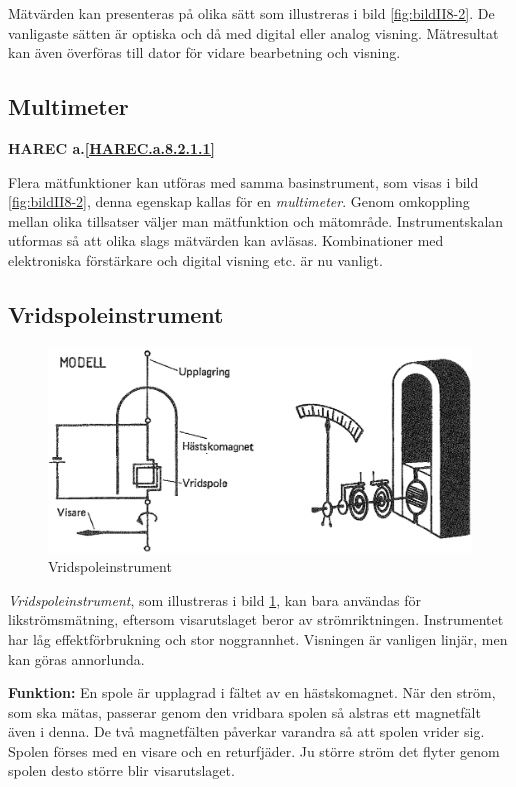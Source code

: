 Mätvärden kan presenteras på olika sätt som illustreras i bild
\ref{fig:bildII8-2}.
De vanligaste sätten är optiska och då med digital eller analog visning.
Mätresultat kan även överföras till dator för vidare bearbetning och visning.

\subsection{Multimeter}
\textbf{
HAREC a.\ref{HAREC.a.8.2.1.1}\label{myHAREC.a.8.2.1.1}
}

Flera mätfunktioner kan utföras med samma basinstrument, som visas i
bild \ref{fig:bildII8-2}, denna egenskap kallas för en \emph{multimeter}.
Genom omkoppling mellan olika tillsatser väljer man mätfunktion och mätområde.
Instrumentskalan utformas så att olika slags mätvärden kan avläsas.
Kombinationer med elektroniska förstärkare och digital visning etc. är nu
vanligt.

\subsection{Vridspoleinstrument}

\begin{figure}
  \includegraphics[width=\textwidth]{images/cropped_pdfs/bild_2_8-03.pdf}
  \caption{Vridspoleinstrument}
  \label{fig:bildII8-3}
\end{figure}

\emph{Vridspoleinstrument}, som illustreras i bild \ref{fig:bildII8-3}, kan
bara användas för likströmsmätning, eftersom visarutslaget beror av
strömriktningen.
Instrumentet har låg effektförbrukning och stor noggrannhet.
Visningen är vanligen linjär, men kan göras annorlunda.

\textbf{Funktion:}
En spole är upplagrad i fältet av en hästskomagnet.
När den ström, som ska mätas, passerar genom den vridbara spolen så alstras ett
magnetfält även i denna.
De två magnetfälten påverkar varandra så att spolen vrider sig.
Spolen förses med en visare och en returfjäder.
Ju större ström det flyter genom spolen desto större blir visarutslaget.

